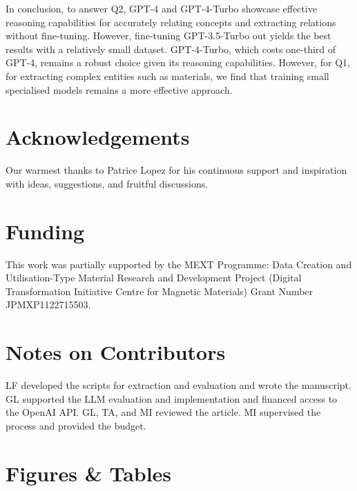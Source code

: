 In conclusion, to answer Q2, GPT-4 and GPT-4-Turbo showcase effective reasoning capabilities for accurately relating concepts and extracting relations without fine-tuning. However, fine-tuning GPT-3.5-Turbo out yields the best results with a relatively small dataset. 
GPT-4-Turbo, which costs one-third of GPT-4, remains a robust choice given its reasoning capabilities. 
However, for Q1, for extracting complex entities such as materials, we find that training small specialised models remains a more effective approach.

\section*{Acknowledgements}
Our warmest thanks to Patrice Lopez for his continuous support and inspiration with ideas, suggestions, and fruitful discussions.


\section*{Funding}
This work was partially supported by the MEXT Programme: Data Creation and Utilisation-Type Material Research and Development Project (Digital Transformation Initiative Centre for Magnetic Materials) Grant Number JPMXP1122715503.


\section*{Notes on Contributors}
LF developed the scripts for extraction and evaluation and wrote the manuscript.
GL supported the LLM evaluation and implementation and financed access to the OpenAI API. 
GL, TA, and MI reviewed the article.
MI supervised the process and provided the budget. 






\section*{Figures \& Tables}

